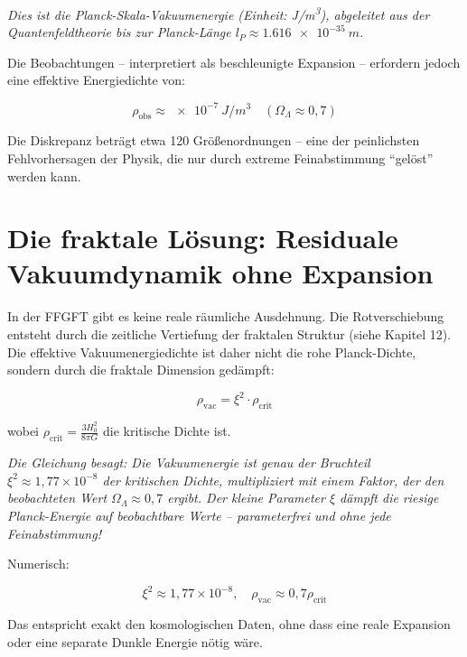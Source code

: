 	\textit{Dies ist die Planck-Skala-Vakuumenergie (Einheit: \si{J/m^3}), abgeleitet aus der Quantenfeldtheorie bis zur Planck-Länge \(l_P \approx \SI{1.616e-35}{m}\).}
	
	Die Beobachtungen – interpretiert als beschleunigte Expansion – erfordern jedoch eine effektive Energiedichte von:
	
	\begin{equation}
		\rho_{\text{obs}} \approx \SI{e-7}{J/m^3} \quad (\Omega_\Lambda \approx 0{,}7)
	\end{equation}
	
	Die Diskrepanz beträgt etwa 120 Größenordnungen – eine der peinlichsten Fehlvorhersagen der Physik, die nur durch extreme Feinabstimmung \enquote{gelöst} werden kann.
	
	\section{Die fraktale Lösung: Residuale Vakuumdynamik ohne Expansion}
	
	In der FFGFT gibt es keine reale räumliche Ausdehnung. Die Rotverschiebung entsteht durch die zeitliche Vertiefung der fraktalen Struktur (siehe Kapitel 12). Die effektive Vakuumenergiedichte ist daher nicht die rohe Planck-Dichte, sondern durch die fraktale Dimension gedämpft:
	
	\begin{equation}
		\rho_{\text{vac}} = \xi^2 \cdot \rho_{\text{crit}}
	\end{equation}
	
	wobei \(\rho_{\text{crit}} = \frac{3 H_0^2}{8\pi G}\) die kritische Dichte ist.
	
	\textit{Die Gleichung besagt: Die Vakuumenergie ist genau der Bruchteil \(\xi^2 \approx 1{,}77 \times 10^{-8}\) der kritischen Dichte, multipliziert mit einem Faktor, der den beobachteten Wert \(\Omega_\Lambda \approx 0{,}7\) ergibt. Der kleine Parameter \(\xi\) dämpft die riesige Planck-Energie auf beobachtbare Werte – parameterfrei und ohne jede Feinabstimmung!}
	
	Numerisch:
	
	\begin{equation}
		\xi^2 \approx 1{,}77 \times 10^{-8}, \quad \rho_{\text{vac}} \approx 0{,}7 \rho_{\text{crit}}
	\end{equation}
	
	Das entspricht exakt den kosmologischen Daten, ohne dass eine reale Expansion oder eine separate Dunkle Energie nötig wäre.
	
